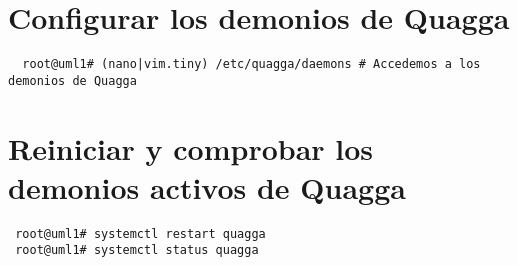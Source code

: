 \documentclass{article}
\begin{document}






\section{Configurar los demonios de Quagga}
\begin{verbatim}
  root@uml1# (nano|vim.tiny) /etc/quagga/daemons # Accedemos a los demonios de Quagga
\end{verbatim}

\section{Reiniciar y comprobar los demonios activos de Quagga}
\begin{verbatim}
 root@uml1# systemctl restart quagga
 root@uml1# systemctl status quagga
\end{verbatim}
\end{document}
